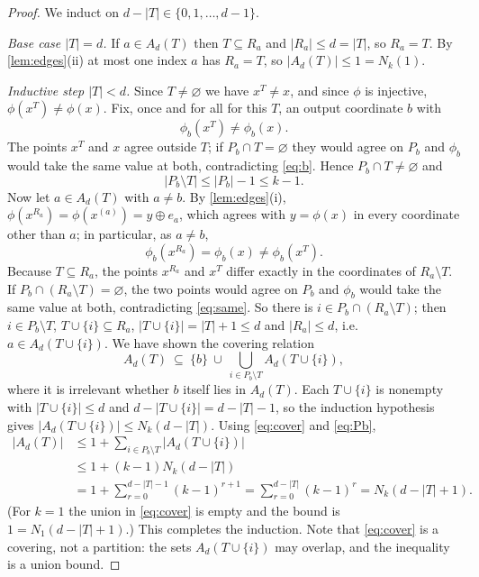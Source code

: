 \documentclass[11pt,a4paper]{article}
\theoremstyle{plain}
\theoremstyle{definition}
\theoremstyle{remark}
\begin{document}
\label{pf:branch}
\lembranch*
\begin{proof}
We induct on $d-|T|\in\{0,1,\dots,d-1\}$.

\emph{Base case $|T|=d$.} If $a\in A_d(T)$ then $T\subseteq R_a$ and $|R_a|\le d=|T|$, so $R_a=T$. By \cref{lem:edges}(ii) at most one index $a$ has $R_a=T$, so $|A_d(T)|\le1=N_k(1)$.

\emph{Inductive step $|T|<d$.} Since $T\ne\varnothing$ we have $x^T\ne x$, and since $\phi$ is injective, $\phi(x^T)\ne\phi(x)$. Fix, once and for all for this $T$, an output coordinate $b$ with
\begin{equation}\label{eq:b}
\phi_b(x^T)\ne\phi_b(x).
\end{equation}
The points $x^T$ and $x$ agree outside $T$; if $P_b\cap T=\varnothing$ they would agree on $P_b$ and $\phi_b$ would take the same value at both, contradicting \eqref{eq:b}. Hence $P_b\cap T\ne\varnothing$ and
\begin{equation}\label{eq:Pb}
|P_b\setminus T|\le|P_b|-1\le k-1 .
\end{equation}
Now let $a\in A_d(T)$ with $a\ne b$. By \cref{lem:edges}(i), $\phi(x^{R_a})=\phi(x^{(a)})=y\oplus e_a$, which agrees with $y=\phi(x)$ in every coordinate other than $a$; in particular, as $a\ne b$,
\begin{equation}\label{eq:same}
\phi_b(x^{R_a})=\phi_b(x)\ne\phi_b(x^T).
\end{equation}
Because $T\subseteq R_a$, the points $x^{R_a}$ and $x^T$ differ exactly in the coordinates of $R_a\setminus T$. If $P_b\cap(R_a\setminus T)=\varnothing$, the two points would agree on $P_b$ and $\phi_b$ would take the same value at both, contradicting \eqref{eq:same}. So there is $i\in P_b\cap(R_a\setminus T)$; then $i\in P_b\setminus T$, $T\cup\{i\}\subseteq R_a$, $|T\cup\{i\}|=|T|+1\le d$ and $|R_a|\le d$, i.e.\ $a\in A_d(T\cup\{i\})$. We have shown the covering relation
\begin{equation}\label{eq:cover}
A_d(T)\ \subseteq\ \{b\}\ \cup\ \bigcup_{i\in P_b\setminus T}A_d(T\cup\{i\}),
\end{equation}
where it is irrelevant whether $b$ itself lies in $A_d(T)$. Each $T\cup\{i\}$ is nonempty with $|T\cup\{i\}|\le d$ and $d-|T\cup\{i\}|=d-|T|-1$, so the induction hypothesis gives $|A_d(T\cup\{i\})|\le N_k(d-|T|)$. Using \eqref{eq:cover} and \eqref{eq:Pb},
\begin{align*}
|A_d(T)|
&\le 1+\sum_{i\in P_b\setminus T}|A_d(T\cup\{i\})|\\
&\le 1+(k-1)N_k(d-|T|)\\
&=1+\sum_{r=0}^{d-|T|-1}(k-1)^{r+1}
 =\sum_{r=0}^{d-|T|}(k-1)^r
 =N_k(d-|T|+1).
\end{align*}
(For $k=1$ the union in \eqref{eq:cover} is empty and the bound is $1=N_1(d-|T|+1)$.) This completes the induction. Note that \eqref{eq:cover} is a covering, not a partition: the sets $A_d(T\cup\{i\})$ may overlap, and the inequality is a union bound.
\end{proof}
\end{document}
